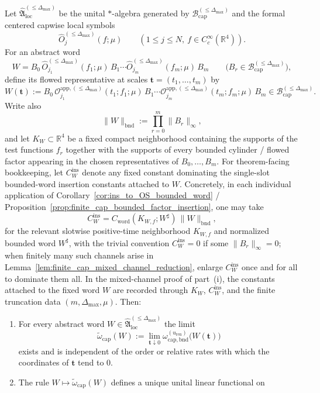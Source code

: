 \begin{theorem}
Let $\widehat{\mathfrak A}_{\mathrm{loc}}^{(\le \Delta_{\max})}$ be the unital $\ast$-algebra generated by
$\mathcal B_{\mathrm{cap}}^{(\le \Delta_{\max})}$ and the formal centered capwise local symbols
\[
\widehat O_j^{(\le \Delta_{\max})}(f;\mu)
\qquad
(1\le j\le N,\ f\in C_c^\infty(\mathbb R^4)).
\]
For an abstract word
\[
W
=
B_0\,\widehat O_{j_1}^{(\le \Delta_{\max})}(f_1;\mu)\,B_1\cdots
\widehat O_{j_m}^{(\le \Delta_{\max})}(f_m;\mu)\,B_m
\qquad
\bigl(B_r\in\mathcal B_{\mathrm{cap}}^{(\le \Delta_{\max})}\bigr),
\]
define its flowed representative at scales $\mathbf t=(t_1,\dots,t_m)$ by
\[
W(\mathbf t)
:=
B_0\,\mathcal O_{j_1}^{\mathrm{app},(\le \Delta_{\max})}(t_1;f_1;\mu)\,B_1\cdots
\mathcal O_{j_m}^{\mathrm{app},(\le \Delta_{\max})}(t_m;f_m;\mu)\,B_m
\in \mathcal B_{\mathrm{cap}}^{(\le \Delta_{\max})}.
\]
Write also
\[
\|W\|_{\mathrm{bnd}}:=\prod_{r=0}^{m}\|B_r\|_{\infty},
\]
and let $K_W\subset\mathbb R^4$ be a fixed compact neighborhood containing the supports of the test functions $f_r$ together with the supports of every bounded cylinder / flowed factor appearing in the chosen representatives of $B_0,\dots,B_m$.
For theorem-facing bookkeeping, let $C_W^{\mathrm{ins}}$ denote any fixed constant dominating the single-slot bounded-word insertion constants attached to $W$.
Concretely, in each individual application of Corollary~\ref{cor:ins_to_OS_bounded_word} / Proposition~\ref{prop:finite_cap_bounded_factor_insertion}, one may take
\[
C_W^{\mathrm{ins}}
=
C_{\mathrm{word}}(K_{W,f};W^{\sharp})\,\|W\|_{\mathrm{bnd}},
\]
for the relevant slotwise positive-time neighborhood $K_{W,f}$ and normalized bounded word $W^{\sharp}$, with the trivial convention $C_W^{\mathrm{ins}}=0$ if some $\|B_r\|_{\infty}=0$; when finitely many such channels arise in Lemma~\ref{lem:finite_cap_mixed_channel_reduction}, enlarge $C_W^{\mathrm{ins}}$ once and for all to dominate them all.
In the mixed-channel proof of part~(i), the constants attached to the fixed word $W$ are recorded through $K_W$, $C_W^{\mathrm{ins}}$, and the finite truncation data $(m,\Delta_{\max},\mu)$.
Then:
\begin{enumerate}[label=(\roman*),leftmargin=2.3em]
\item For every abstract word $W\in\widehat{\mathfrak A}_{\mathrm{loc}}^{(\le \Delta_{\max})}$ the limit
\[
\widetilde\omega_{\mathrm{cap}}(W)
:=
\lim_{\mathbf t\downarrow 0}
\omega_{\mathrm{cap,bnd}}^{(u_{\mathrm{ren}})}\bigl(W(\mathbf t)\bigr)
\]
exists and is independent of the order or relative rates with which the coordinates of $\mathbf t$ tend to $0$.
\item The rule $W\mapsto\widetilde\omega_{\mathrm{cap}}(W)$ defines a unique unital linear functional on

\end{enumerate}
\end{theorem}
